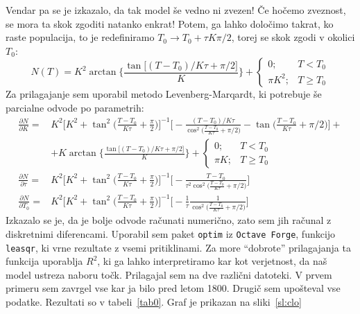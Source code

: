 \documentclass[a4 paper, 12pt]{article}
\newcommand{\der}[2]{
	\ensuremath{\frac{\partial #1}{\partial #2}}
}
\begin{document}
Vendar pa se je izkazalo, da tak model \v se vedno ni zvezen! \v Ce ho\v cemo zveznost, se mora ta skok zgoditi
natanko enkrat! Potem, ga lahko dolo\v cimo takrat, ko raste populacija, to je redefiniramo $T_0 \to T_0 + \tau K\pi/2$,
torej se skok zgodi v okolici $T_0$:
\begin{equation}
	N(T) = K^2 \arctan\Bigg\{\frac{\tan\big[(T - T_0)/K\tau + \pi/2\big]}{K}\Bigg\} + \left\{
		\begin{matrix}
			0; & T < T_0 \\
			\pi K^2; & T \geq T_0
		\end{matrix}
		\right.
\end{equation}
Za prilagajanje sem uporabil metodo Levenberg-Marqardt, ki potrebuje \v se parcialne odvode po parametrih:
\begin{align*}
	\der{N}{K} =& K^2\bigg[K^2 + \tan^2\bigg(\frac{T - T_0}{K\tau} + \frac{\pi}{2}\bigg)\bigg]^{-1}
	\bigg[-\frac{(T - T_0)/K\tau}{\cos^2\big(\frac{T-T_0}{K\tau} + \pi/2\big)} - \tan\bigg(\frac{T - T_0}{K\tau}
	+ \pi/2\bigg)\bigg] + \\
	&+ K \arctan\Bigg\{\frac{\tan\big[(T - T_0)/K\tau + \pi/2\big]}{K}\Bigg\}  + \left\{
	\begin{matrix}
		0; & T < T_0 \\
		\pi K; & T \geq T_0
	\end{matrix}
	\right. \\
	\der{N}{\tau} =& K^2\bigg[K^2 + \tan^2\bigg(\frac{T - T_0}{K\tau} + \frac{\pi}{2}\bigg)\bigg]^{-1}
	\bigg[- \frac{T - T_0}{\tau^2 \cos^2\big(\frac{T - T_0}{K\tau} + \pi/2\big)}\bigg] \\
	\der{N}{T_0} =& K^2\bigg[K^2 + \tan^2\bigg(\frac{T - T_0}{K\tau} + \frac{\pi}{2}\bigg)\bigg]^{-1}
	\bigg[- \frac{1}{\tau} \frac{1}{\cos^2\big(\frac{T - T_0}{K\tau} + \pi/2\big)} \bigg]
\end{align*}
Izkazalo se je, da je bolje odvode ra\v cunati numeri\v cno, zato sem jih ra\v cunal z diskretnimi diferencami.
Uporabil sem paket {\tt optim} iz {\tt Octave Forge}, funkcijo {\tt leasqr}, ki vrne rezultate z vsemi pritiklinami.
Za more "`dobrote"' prilagajanja ta funkcija uporablja $R^2$, ki ga lahko interpretiramo kar kot verjetnost, da
na\v s model ustreza naboru to\v ck. Prilagajal sem na dve razli\v cni datoteki. V prvem
primeru sem zavrgel vse kar ja bilo pred letom 1800. Drugi\v c sem upo\v steval vse podatke. Rezultati so v
tabeli~\ref{tab0}. Graf je prikazan na sliki~\ref{sl:clo}
\end{document}
